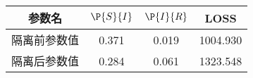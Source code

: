 \begin{tabular}{cccc}
\hline
参数名&$\P{S}{I}$&$\P{I}{R}$&LOSS\\
\hline
隔离前参数值&0.371&0.019&1004.930\\
隔离后参数值&0.284&0.061&1323.548\\
\hline
\end{tabular}